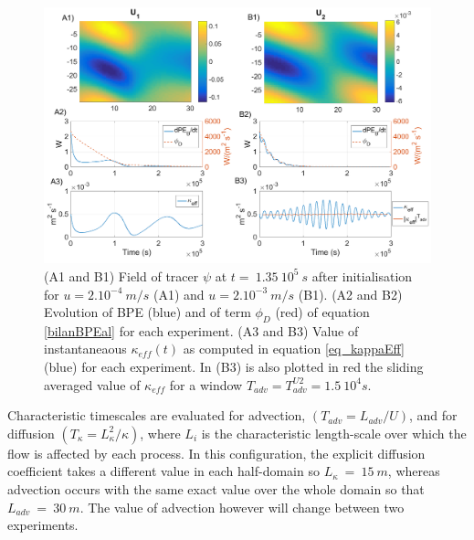 \begin{figure}[h!]
\centering
\includegraphics[width=1\textwidth]{./CHAP_BPE/Fig_numlab_advdiff3.png}
\caption{(A1 and B1) Field of tracer $\psi$ at $t= \ 1.35\ 10^5\ s$ after initialisation for $u=2.10^{-4} \ m/s$ (A1) and $u=2.10^{-3} \ m/s$ (B1). (A2 and B2) Evolution of BPE (blue) and of term $\phi_D$ (red) of equation \ref{bilanBPEal} for each experiment. (A3 and B3) Value of instantaneaous $\kappa_{eff} (t)$ as computed in equation \ref{eq_kappaEff} (blue) for each experiment. In (B3) is also plotted in red the sliding averaged value of $\kappa_{eff}$ for a window $T_{adv}=T_{adv}^{U2}=1.5\ 10^4 s$.}
\label{fig4numlab}
\end{figure}
Characteristic timescales are evaluated for advection, $(T_{adv}=L_{adv}/U)$, and for diffusion $(T_{\kappa}=L_{\kappa}^2/{\kappa})$, where $L_i$ is the characteristic length-scale over which the flow is affected by each process. In this configuration, the explicit diffusion coefficient takes a different value in each half-domain so $L_{\kappa}\ =\ 15\ m$, whereas advection occurs with the same exact value over the whole domain so that $L_{adv}\ =\ 30\ m$. The value of advection however will change between two experiments.

